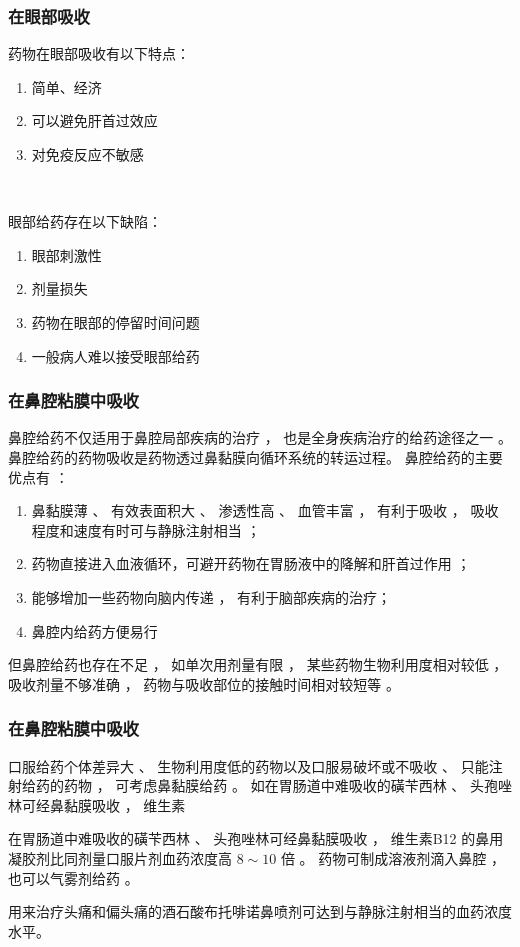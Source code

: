 \begin{frame}
    \frametitle{在眼部吸收}
    \hspace{-2em}
    \begin{minipage}{0.48\linewidth}
      药物在眼部吸收有以下特点：
      \begin{enumerate}
        \item 简单、经济
        \item 可以避免肝首过效应
        \item 对免疫反应不敏感
      \end{enumerate}

      ~~
    \end{minipage}\hfill
    \begin{minipage}{0.48\linewidth}
      眼部给药存在以下缺陷：
      \begin{enumerate}
        \item 眼部刺激性
        \item 剂量损失
        \item 药物在眼部的停留时间问题
        \item 一般病人难以接受眼部给药
      \end{enumerate}
    \end{minipage}
\end{frame}


\begin{frame}
    \frametitle{在鼻腔粘膜中吸收}
    鼻腔给药不仅适用于鼻腔局部疾病的治疗 ， 也是全身疾病治疗的给药途径之一 。 鼻腔给药的药物吸收是药物透过鼻黏膜向循环系统的转运过程。 鼻腔给药的主要优点有 ：

    \begin{enumerate}
      \item 鼻黏膜薄 、 有效表面积大 、 渗透性高 、 血管丰富 ， 有利于吸收 ， 吸收程度和速度有时可与静脉注射相当 ；
      \item 药物直接进入血液循环，可避开药物在胃肠液中的降解和肝首过作用 ；
      \item 能够增加一些药物向脑内传递 ， 有利于脑部疾病的治疗；
      \item 鼻腔内给药方便易行
    \end{enumerate}

    但鼻腔给药也存在不足 ， 如单次用剂量有限 ， 某些药物生物利用度相对较低 ， 吸收剂量不够准确 ， 药物与吸收部位的接触时间相对较短等 。
\end{frame}


\begin{frame}
    \frametitle{在鼻腔粘膜中吸收}
    口服给药个体差异大 、 生物利用度低的药物以及口服易破坏或不吸收 、 只能注射给药的药物 ， 可考虑鼻黏膜给药 。 如在胃肠道中难吸收的磺苄西林 、 头孢唑林可经鼻黏膜吸收 ， 维生素
    \begin{blankblock}{}
      在胃肠道中难吸收的磺苄西林 、 头孢唑林可经鼻黏膜吸收 ， 维生素B12 的鼻用凝胶剂比同剂量口服片剂血药浓度高 $8\sim 10$ 倍 。 药物可制成溶液剂滴入鼻腔 ， 也可以气雾剂给药 。 

      用来治疗头痛和偏头痛的酒石酸布托啡诺鼻喷剂可达到与静脉注射相当的血药浓度水平。
    \end{blankblock}
\end{frame}


